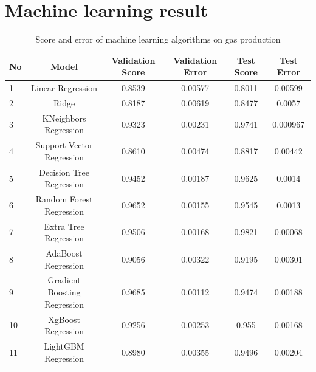 \documentclass[12pt,a4paper]{report}
\begin{document}
\chapter{Machine learning result}
\begin{table}[H]
\caption{Score and error of machine learning algorithms on gas production}
\centering
\begin{adjustbox}{width=1\textwidth}
\small
\begin{tabular}{|l|c|c|c|c|c|}
\hline
\textbf{No} & \textbf{Model}               & \textbf{Validation Score} & \textbf{Validation Error} & \textbf{Test Score} & \textbf{Test Error} \\ \hline
1           & Linear Regression            & 0.8539                    & 0.00577                   & 0.8011              & 0.00599             \\ \hline
2           & Ridge                        & 0.8187                    & 0.00619                   & 0.8477              & 0.0057              \\ \hline
3           & KNeighbors Regression        & 0.9323                    & 0.00231                   & 0.9741              & 0.000967            \\ \hline
4           & Support Vector Regression    & 0.8610                    & 0.00474                   & 0.8817              & 0.00442             \\ \hline
5           & Decision Tree Regression     & 0.9452                    & 0.00187                   & 0.9625              & 0.0014              \\ \hline
6           & Random Forest Regression     & 0.9652                    & 0.00155                   & 0.9545              & 0.0013              \\ \hline
7           & Extra Tree Regression        & 0.9506                    & 0.00168                   & 0.9821              & 0.00068             \\ \hline
8           & AdaBoost Regression          & 0.9056                    & 0.00322                   & 0.9195              & 0.00301             \\ \hline
9           & Gradient Boosting Regression & 0.9685                    & 0.00112                   & 0.9474              & 0.00188             \\ \hline
10          & XgBoost Regression           & 0.9256                    & 0.00253                   & 0.955               & 0.00168             \\ \hline
11          & LightGBM Regression          & 0.8980                    & 0.00355                   & 0.9496              & 0.00204             \\ \hline
\end{tabular}
\end{adjustbox}
\end{table}
\end{document}
